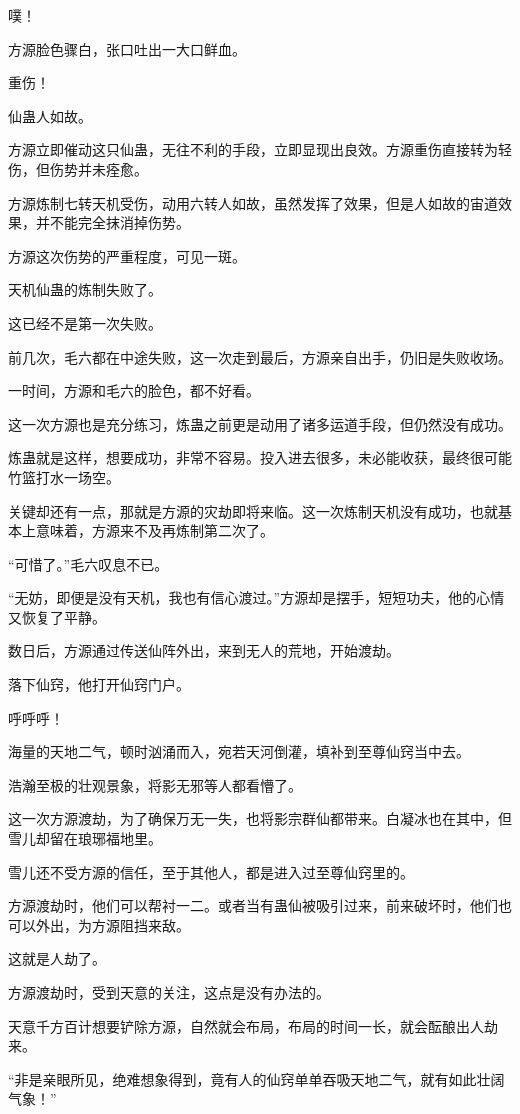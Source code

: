 \begin{this_body}
噗！

方源脸色骤白，张口吐出一大口鲜血。

重伤！

仙蛊人如故。

方源立即催动这只仙蛊，无往不利的手段，立即显现出良效。方源重伤直接转为轻伤，但伤势并未痊愈。

方源炼制七转天机受伤，动用六转人如故，虽然发挥了效果，但是人如故的宙道效果，并不能完全抹消掉伤势。

方源这次伤势的严重程度，可见一斑。

天机仙蛊的炼制失败了。

这已经不是第一次失败。

前几次，毛六都在中途失败，这一次走到最后，方源亲自出手，仍旧是失败收场。

一时间，方源和毛六的脸色，都不好看。

这一次方源也是充分练习，炼蛊之前更是动用了诸多运道手段，但仍然没有成功。

炼蛊就是这样，想要成功，非常不容易。投入进去很多，未必能收获，最终很可能竹篮打水一场空。

关键却还有一点，那就是方源的灾劫即将来临。这一次炼制天机没有成功，也就基本上意味着，方源来不及再炼制第二次了。

“可惜了。”毛六叹息不已。

“无妨，即便是没有天机，我也有信心渡过。”方源却是摆手，短短功夫，他的心情又恢复了平静。

数日后，方源通过传送仙阵外出，来到无人的荒地，开始渡劫。

落下仙窍，他打开仙窍门户。

呼呼呼！

海量的天地二气，顿时汹涌而入，宛若天河倒灌，填补到至尊仙窍当中去。

浩瀚至极的壮观景象，将影无邪等人都看懵了。

这一次方源渡劫，为了确保万无一失，也将影宗群仙都带来。白凝冰也在其中，但雪儿却留在琅琊福地里。

雪儿还不受方源的信任，至于其他人，都是进入过至尊仙窍里的。

方源渡劫时，他们可以帮衬一二。或者当有蛊仙被吸引过来，前来破坏时，他们也可以外出，为方源阻挡来敌。

这就是人劫了。

方源渡劫时，受到天意的关注，这点是没有办法的。

天意千方百计想要铲除方源，自然就会布局，布局的时间一长，就会酝酿出人劫来。

“非是亲眼所见，绝难想象得到，竟有人的仙窍单单吞吸天地二气，就有如此壮阔气象！”


\end{this_body}
